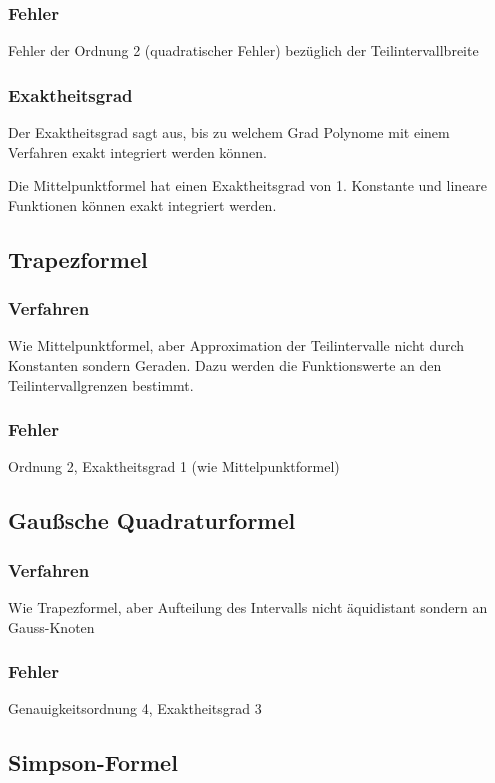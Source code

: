 \documentclass[a4paper, 12pt]{article}
\begin{document}
\subsubsection*{Fehler}
Fehler der Ordnung 2 (quadratischer Fehler) bezüglich der Teilintervallbreite

\subsubsection*{Exaktheitsgrad}
Der Exaktheitsgrad sagt aus, bis zu welchem Grad Polynome mit einem Verfahren exakt integriert werden können.

Die Mittelpunktformel hat einen Exaktheitsgrad von 1. Konstante und lineare Funktionen können exakt integriert werden.


\subsection{Trapezformel}

\subsubsection*{Verfahren}
Wie Mittelpunktformel, aber Approximation der Teilintervalle nicht durch Konstanten sondern Geraden. Dazu werden die Funktionswerte an den Teilintervallgrenzen bestimmt.

\subsubsection*{Fehler}
Ordnung 2, Exaktheitsgrad 1 (wie Mittelpunktformel)


\subsection{Gaußsche Quadraturformel}

\subsubsection*{Verfahren}
Wie Trapezformel, aber Aufteilung des Intervalls nicht äquidistant sondern an Gauss-Knoten

\subsubsection*{Fehler}
Genauigkeitsordnung 4, Exaktheitsgrad 3


\subsection{Simpson-Formel}
\end{document}

